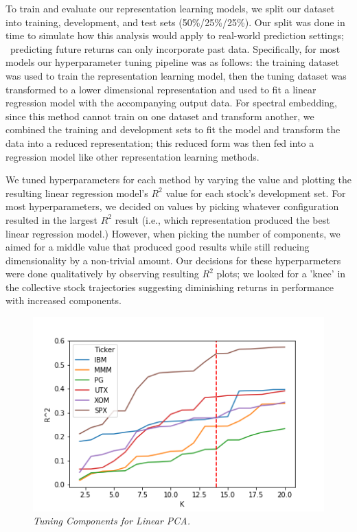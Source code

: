 \documentclass[a4paper]{article}
\begin{document}
   \par To train and evaluate our representation learning models, we split our dataset into training, development, and test sets (50\%/25\%/25\%). Our split was done in time to simulate how this analysis would apply to real-world prediction settings;  predicting future returns can only incorporate past data. Specifically, for most models our hyperparameter tuning pipeline was as follows: the training dataset was used to train the representation learning model, then the tuning dataset was transformed to a lower dimensional representation and used to fit a linear regression model with the accompanying output data. For spectral embedding, since this method cannot train on one dataset and transform another, we combined the training and development sets to fit the model and transform the data into a reduced representation; this reduced form was then fed into a regression model like other representation learning methods.
   \par We tuned hyperparameters for each method by varying the value and plotting the resulting linear regression model's $R^2$ value for each stock's development set. For most hyperparameters, we decided on values by picking whatever configuration resulted in the largest $R^2$ result (i.e., which representation produced the best linear regression model.) However, when picking the number of components, we aimed for a middle value that produced good results while still reducing dimensionality by a non-trivial amount. Our decisions for these hyperparmeters were done qualitatively by observing resulting $R^2$ plots; we looked for a 'knee' in the collective stock trajectories suggesting diminishing returns in performance with increased components.
   
   \begin{figure}[t]
   	\centering
   	\includegraphics[width=\linewidth]{linPCA_tune.png}
   	\caption{{\it Tuning Components for Linear PCA.}}
   	\label{fig:LinPCATuning}
   \end{figure}
   
\end{document}
